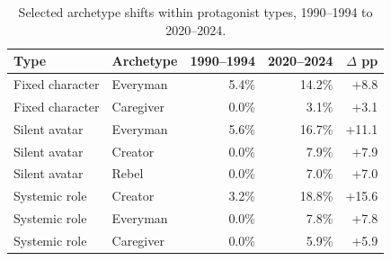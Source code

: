 \begin{table}[t]
\centering
\caption{Selected archetype shifts within protagonist types, 1990--1994 to 2020--2024.}
\label{tab:archetype_shifts_within_type}
\small
\setlength{\tabcolsep}{5pt}
\begin{tabular}{llrrr}
\toprule
\textbf{Type} & \textbf{Archetype} & \textbf{1990--1994} & \textbf{2020--2024} & \textbf{$\Delta$ pp} \\
\midrule
Fixed character & Everyman & 5.4\% & 14.2\% & +8.8 \\
Fixed character & Caregiver & 0.0\% & 3.1\% & +3.1 \\
Silent avatar & Everyman & 5.6\% & 16.7\% & +11.1 \\
Silent avatar & Creator & 0.0\% & 7.9\% & +7.9 \\
Silent avatar & Rebel & 0.0\% & 7.0\% & +7.0 \\
Systemic role & Creator & 3.2\% & 18.8\% & +15.6 \\
Systemic role & Everyman & 0.0\% & 7.8\% & +7.8 \\
Systemic role & Caregiver & 0.0\% & 5.9\% & +5.9 \\
\bottomrule
\end{tabular}
\end{table}
